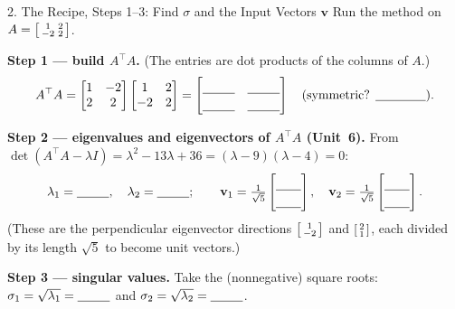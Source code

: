 \documentclass[10pt]{article}
\newcommand{\vv}{\mathbf{v}}
\newcommand{\T}{^{\top}}
\begin{document}
\begin{notesbox}{2. The Recipe, Steps 1--3: Find $\sigma$ and the Input Vectors $\vv$}
Run the method on $A=\begin{bsmallmatrix} 1 & 2\\ -2 & 2 \end{bsmallmatrix}$.

\vspace{2pt}
\textbf{Step 1 --- build $A\T A$.} (The entries are dot products of the columns of $A$.)
\[
  A\T A=\begin{bmatrix} 1 & -2\\ 2 & 2 \end{bmatrix}\begin{bmatrix} 1 & 2\\ -2 & 2 \end{bmatrix}
  =\begin{bmatrix}\rule{0pt}{1.1em}\blank{0.9cm} & \blank{0.9cm}\\[2pt]\blank{0.9cm} & \blank{0.9cm}\end{bmatrix}
  \quad(\text{symmetric? }\blank{1.4cm}).
\]

\textbf{Step 2 --- eigenvalues and eigenvectors of $A\T A$ (Unit~6).} From
$\det(A\T A-\lambda I)=\lambda^2-13\lambda+36=(\lambda-9)(\lambda-4)=0$:
\[
  \lambda_1=\blank{0.9cm},\quad \lambda_2=\blank{0.9cm};\qquad
  \vv_1=\tfrac{1}{\sqrt5}\begin{bmatrix}\rule{0pt}{1.1em}\blank{0.7cm}\\[2pt]\blank{0.7cm}\end{bmatrix},\quad
  \vv_2=\tfrac{1}{\sqrt5}\begin{bmatrix}\rule{0pt}{1.1em}\blank{0.7cm}\\[2pt]\blank{0.7cm}\end{bmatrix}.
\]
(These are the perpendicular eigenvector directions $\begin{bsmallmatrix} 1\\ -2 \end{bsmallmatrix}$ and
$\begin{bsmallmatrix} 2\\ 1 \end{bsmallmatrix}$, each divided by its length $\sqrt5$ to become unit vectors.)

\textbf{Step 3 --- singular values.} Take the (nonnegative) square roots:
$\sigma_1=\sqrt{\lambda_1}=\blank{0.9cm}$ and $\sigma_2=\sqrt{\lambda_2}=\blank{0.9cm}$.


\end{notesbox}
\end{document}
